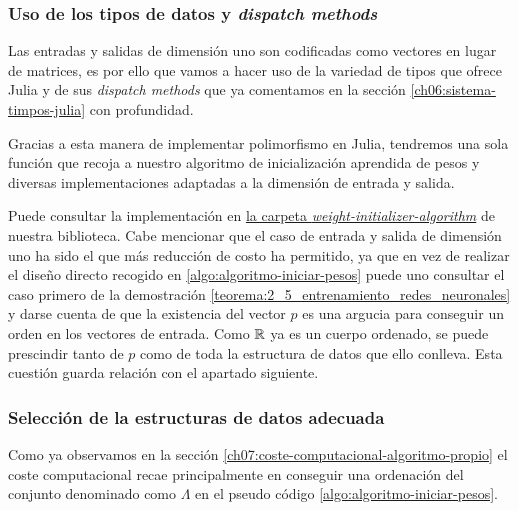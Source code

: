 \subsubsection{ Uso de los tipos de datos y \textit{ dispatch methods}}
Las entradas y salidas de dimensión uno son codificadas como vectores en lugar de matrices, 
es por ello que vamos a hacer uso de la variedad de tipos que ofrece Julia y de sus \textit{dispatch methods} que ya comentamos en 
la sección \ref{ch06:sistema-timpos-julia} con
 profundidad. 

 Gracias a esta manera de implementar polimorfismo 
 en Julia, tendremos una sola función que recoja a 
 nuestro algoritmo de inicialización aprendida de pesos y diversas implementaciones adaptadas a la dimensión de entrada y salida. 

 Puede consultar la implementación en \href{https://github.com/BlancaCC/TFG-Estudio-de-las-redes-neuronales/tree/main/OptimizedNeuralNetwork.jl/src}{la carpeta \textit{weight-initializer-algorithm}} de nuestra biblioteca. 
 Cabe mencionar que el caso de entrada y salida de dimensión uno ha sido el que más reducción de costo 
 ha permitido, ya que en vez de realizar 
 el diseño directo recogido en \ref{algo:algoritmo-iniciar-pesos} puede uno consultar 
 el caso primero de la demostración  \ref{teorema:2_5_entrenamiento_redes_neuronales}
 y darse cuenta de que la existencia del vector $p$ 
 es una argucia para conseguir un orden en los vectores de entrada. Como $\mathbb{R}$ ya es un cuerpo ordenado, se puede prescindir tanto de $p$ como de toda la estructura de datos que ello conlleva. 
 Esta cuestión guarda relación con el apartado siguiente. 

\subsubsection{Selección de la estructuras de datos adecuada}
Como ya observamos en  la sección \ref{ch07:coste-computacional-algoritmo-propio} el coste computacional recae principalmente en conseguir una ordenación del conjunto denominado como 
$\Lambda$ en el pseudo código \ref{algo:algoritmo-iniciar-pesos}. 

